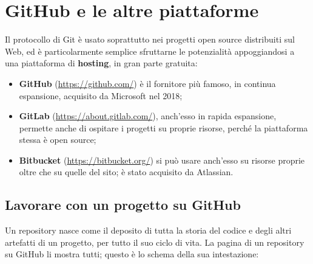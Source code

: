 \section{GitHub e le altre piattaforme}

Il protocollo di Git è usato soprattutto nei progetti open source distribuiti sul Web, ed è particolarmente semplice
sfruttarne le potenzialità appoggiandosi a una piattaforma di \textbf{hosting}, in gran parte gratuita:

\begin{itemize}
  \item \textbf{GitHub} (\url{https://github.com/}) è il fornitore più famoso, in continua espansione, acquisito da
        Microsoft nel 2018;
  \item \textbf{GitLab} (\url{https://about.gitlab.com/}), anch'esso in rapida espansione, permette anche di ospitare i
        progetti su proprie risorse, perché la piattaforma stessa è open source;
  \item \textbf{Bitbucket} (\url{https://bitbucket.org/}) si può usare anch'esso su risorse proprie oltre che su quelle del
        sito; è stato acquisito da Atlassian.
\end{itemize}

\subsection{Lavorare con un progetto su GitHub}

Un repository nasce come il deposito di tutta la storia del codice e degli altri artefatti di un progetto, per tutto il
suo ciclo di vita. La pagina di un repository su GitHub li mostra tutti; questo è lo schema della sua intestazione:

